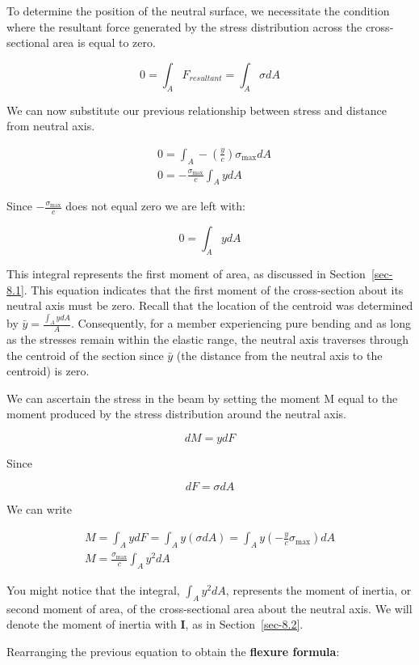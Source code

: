 \documentclass[
  letterpaper,
  DIV=11,
  numbers=noendperiod]{scrreprt}
\theoremstyle{definition}
\theoremstyle{remark}
\begin{document}
To determine the position of the neutral surface, we necessitate the
condition where the resultant force generated by the stress distribution
across the cross-sectional area is equal to zero.

\[
0=\int_A F_{resultant}=\int_A \sigma d A
\]

We can now substitute our previous relationship between stress and
distance from neutral axis.

\[
\begin{aligned}
& 0=\int_A-\left(\frac{y}{c}\right) \sigma_{\max } d A \\
& 0=-\frac{\sigma_{\max }}{c} \int_A y d A
\end{aligned}
\]

Since \(-\frac{\sigma_{\max }}{c}\) does not equal zero we are left
with:

\[
0=\int_A y d A
\]

This integral represents the first moment of area, as discussed in
Section~\ref{sec-8.1}. This equation indicates that the first moment of
the cross-section about its neutral axis must be zero. Recall that the
location of the centroid was determined by
\(\bar{y}=\frac{\int_A y d A}{A}\). Consequently, for a member
experiencing pure bending and as long as the stresses remain within the
elastic range, the neutral axis traverses through the centroid of the
section since \(\bar{y}\) (the distance from the neutral axis to the
centroid) is zero.

We can ascertain the stress in the beam by setting the moment M equal to
the moment produced by the stress distribution around the neutral axis.

\[
d M=y d F
\]

Since

\[
d F=\sigma d A
\]

We can write

\[
\begin{gathered}
M=\int_A y d F=\int_A y(\sigma d A)=\int_A y\left(-\frac{y}{c} \sigma_{\max }\right) d A \\
M=\frac{\sigma_{\max }}{c} \int_A y^2 d A
\end{gathered}
\]

You might notice that the integral, \(\int_A y^2 d A\), represents the
moment of inertia, or second moment of area, of the cross-sectional area
about the neutral axis. We will denote the moment of inertia with
\textbf{I}, as in Section~\ref{sec-8.2}.

Rearranging the previous equation to obtain the \textbf{flexure
formula}:
\end{document}
